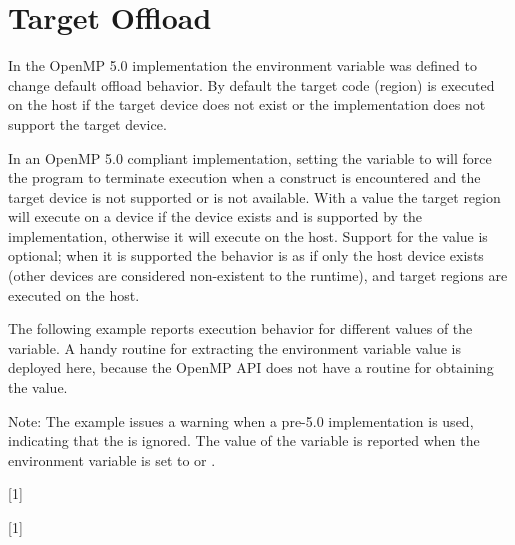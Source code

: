 \section{Target Offload}
\label{sec:target_offload}

In the OpenMP 5.0 implementation the 
environment variable was defined to change default offload behavior.
By default the target code (region) is executed on the host if the target device
does not exist or the implementation does not support the target device.  

In an OpenMP 5.0 compliant implementation, setting the 
 variable to  will 
force the program to terminate execution when a  
construct is encountered and the target device is not supported or is not available.
With a value  the target region will execute on a device if the
device exists and is supported by the implementation,
otherwise it will execute on the host.
Support for the 
value is optional; when it is supported the behavior is as if only the 
host device exists (other devices are considered non-existent to the runtime), 
and target regions are executed on the host.  

The following example reports execution behavior for different 
values of the  variable. A handy routine 
for extracting the  environment variable
value is deployed here, because the OpenMP API does not have a routine 
for obtaining the value. %

Note: 
The example issues a warning when a pre-5.0 implementation is used,
indicating that the  is ignored.
The value of the  variable is reported 
when the  
environment variable is set to  or .

{}[1]

{}[1]


